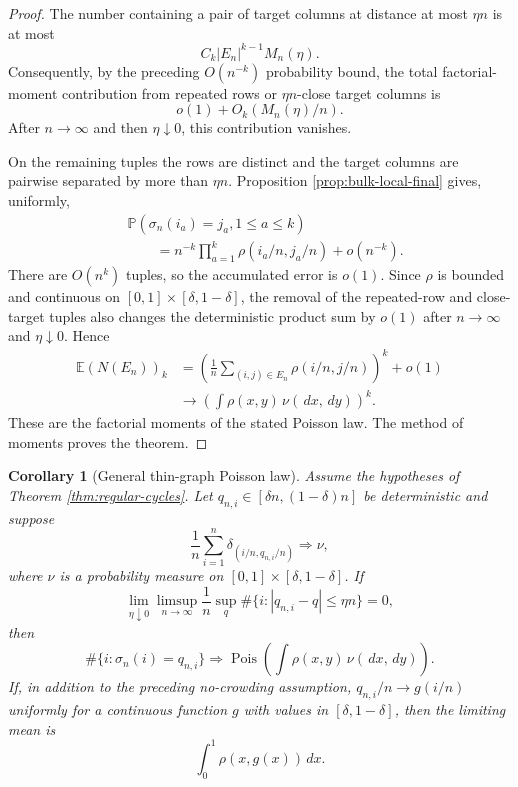 \documentclass[11pt]{article}
\newtheorem{corollary}[theorem]{Corollary}
\theoremstyle{remark}
\newcommand{\Pp}{\mathbb P}
\newcommand{\Ee}{\mathbb E}
\newcommand{\Pois}{\operatorname{Pois}}
\newcommand{\dd}{\,d}
\begin{document}
\begin{proof}
The number containing a pair of target columns at distance at most $\eta n$ is
at most
\[
        C_k |E_n|^{k-1}M_n(\eta).
\]
Consequently, by the preceding $O(n^{-k})$ probability bound, the total
factorial-moment contribution from repeated rows or $\eta n$-close target
columns is
\[
        o(1)+O_k(M_n(\eta)/n).
\]
After $n\to\infty$ and then $\eta\downarrow0$, this contribution vanishes.

On the remaining tuples the rows are distinct and the target columns are
pairwise separated by more than $\eta n$.  Proposition
\ref{prop:bulk-local-final} gives, uniformly,
\[
\begin{aligned}
        &\Pp(\sigma_n(i_a)=j_a,1\le a\le k)\\
        &\qquad=n^{-k}\prod_{a=1}^k
        \rho(i_a/n,j_a/n)+o(n^{-k}).
\end{aligned}
\]
There are $O(n^k)$ tuples, so the accumulated error is $o(1)$.  Since $\rho$ is
bounded and continuous on $[0,1]\times[\delta,1-\delta]$, the removal of the
repeated-row and close-target tuples also changes the deterministic product sum
by $o(1)$ after $n\to\infty$ and $\eta\downarrow0$.  Hence
\[
\begin{aligned}
        \Ee(N(E_n))_k
        &=\left(\frac1n\sum_{(i,j)\in E_n}
        \rho(i/n,j/n)\right)^k+o(1)\\
        &\longrightarrow
        \left(\int\rho(x,y)\,\nu(\dd x,\dd y)\right)^k.
\end{aligned}
\]
These are the factorial moments of the stated Poisson law.  The method of
moments proves the theorem.
\end{proof}

\begin{corollary}[General thin-graph Poisson law]\label{cor:thin-graph-general}
Assume the hypotheses of Theorem \ref{thm:regular-cycles}.  Let
$q_{n,i}\in[\delta n,(1-\delta)n]$ be deterministic and suppose
\[
        \frac1n\sum_{i=1}^n
        \delta_{(i/n,q_{n,i}/n)}\Rightarrow\nu,
\]
where $\nu$ is a probability measure on $[0,1]\times[\delta,1-\delta]$.
If
\[
        \lim_{\eta\downarrow0}\limsup_{n\to\infty}
        \frac1n\sup_q
        \#\{i:|q_{n,i}-q|\le\eta n\}=0,
\]
then
\[
        \#\{i:\sigma_n(i)=q_{n,i}\}
        \Rightarrow
        \Pois\!\left(\int\rho(x,y)\,\nu(\dd x,\dd y)\right).
\]
If, in addition to the preceding no-crowding assumption,
$q_{n,i}/n\to g(i/n)$ uniformly for a continuous function $g$ with values in
$[\delta,1-\delta]$, then the limiting mean is
\[
        \int_0^1\rho(x,g(x))\dd x.
\]
\end{corollary}
\end{document}
